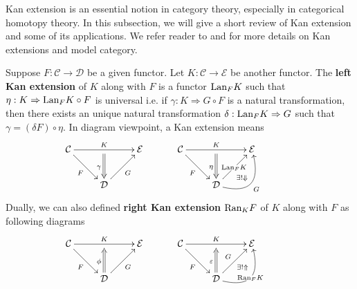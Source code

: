 
Kan extension is an essential notion in category theory, especially in categorical homotopy theory. In this subsection, we will give a short review of Kan extension and some of its applications. We refer reader to \cite{Rieh2014} and \citep{Quil1967} for more details on Kan extensions and model category.
\par
\begin{mydefn}
Suppose $F: \mathcal{C} \rightarrow \mathcal{D}$ be a given functor. Let $K: \mathcal{C} \rightarrow \mathcal{E}$ be another functor. The \textbf{left Kan extension} of $K$ along with $F$ is a functor $\textup{Lan}_{F}K$ such that $\eta : K \Rightarrow \textup{Lan}_{F}K \circ F$ is universal i.e. if $\gamma: K \Rightarrow G \circ F$ is a natural transformation, then there exists an unique natural transformation $\delta: \textup{Lan}_{F}K \Rightarrow G$ such that $\gamma = (\delta F)\circ \eta$.
In diagram viewpoint, a Kan extension means
\begin{align*}
    \xymatrix{
    \mathcal{C} \ar[rr]^{K}\ar[rd]_{F}&\ar@{=>}[d]_{\gamma}  & \mathcal{E}&\\
    & \mathcal{D} \ar[ru]_{G}& &\\
    }&\xymatrix{
    \mathcal{C} \ar[rr]^{K}\ar[rd]_{F}&\ar@{=>}[d]_{\eta}  & \mathcal{E}&\\
    & \mathcal{D} \ar[ru]|{\Lan_{F}K}\ar@/_2pc/[ru]_{G}^{\exists!\Downarrow}& &\\
    }
\end{align*}
Dually, we can also defined \textbf{right Kan extension} $\textup{Ran}_{K}F$ of $K$ along with $F$ as following diagrams
\begin{align*}
    \xymatrix{
    \mathcal{C} \ar[rr]^{K}\ar[rd]_{F}&  & \mathcal{E}&\\
    & \mathcal{D}\ar@{=>}[u]^{\phi} \ar[ru]_{G}& &\\
    }&\xymatrix{
    \mathcal{C} \ar[rr]^{K}\ar[rd]_{F}&  & \mathcal{E}&\\
    & \mathcal{D} \ar@{=>}[u]^{\varepsilon} \ar@/_2pc/[ru]|{\Ran_{F}K}\ar[ru]^{G}_{\exists!\Uparrow}& &\\
    }
\end{align*}
\end{mydefn}

